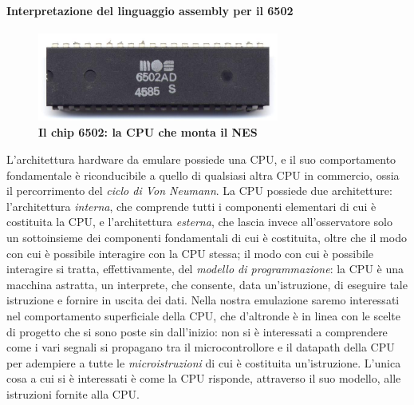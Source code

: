 \documentclass[11pt]{article}
\begin{document}
\paragraph{Interpretazione del linguaggio assembly per il 6502}
\begin{figure}[h]
\centering
\includegraphics[width=300px, height=110px]{6502.jpg}\\
\small\textbf{Il chip 6502: la CPU che monta il NES}
\end{figure}
L'architettura hardware da emulare possiede una CPU, e il suo comportamento fondamentale è riconducibile a quello di qualsiasi altra CPU in commercio, ossia il percorrimento del \emph{ciclo di Von Neumann}. La CPU possiede due architetture: l'architettura \emph{interna}, che comprende tutti i componenti elementari di cui è costituita la CPU, e l'architettura \emph{esterna}, che lascia invece all'osservatore solo un sottoinsieme dei componenti fondamentali di cui è costituita, oltre che il modo con cui è possibile interagire con la CPU stessa; il modo con cui è possibile interagire si tratta, effettivamente, del \emph{modello di programmazione}: la CPU è una macchina astratta, un interprete, che consente, data un'istruzione, di eseguire tale istruzione e fornire in uscita dei dati. Nella nostra emulazione saremo interessati nel comportamento superficiale della CPU, che d'altronde è in linea con le scelte di progetto che si sono poste sin dall'inizio: non si è interessati a comprendere come i vari segnali si propagano tra il microcontrollore e il datapath della CPU per adempiere a tutte le \emph{microistruzioni} di cui è costituita un'istruzione. L'unica cosa a cui si è interessati è come la CPU risponde, attraverso il suo modello, alle istruzioni fornite alla CPU.
\clearpage
\end{document}
